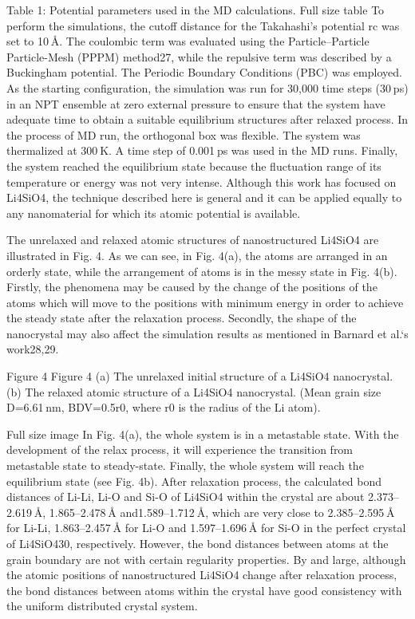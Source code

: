 \documentclass{article}
\begin{document}
Table 1: Potential parameters used in the MD calculations.
Full size table
To perform the simulations, the cutoff distance for the Takahashi’s potential rc was set to 10 Å. The coulombic term was evaluated using the Particle–Particle Particle-Mesh (PPPM) method27, while the repulsive term was described by a Buckingham potential. The Periodic Boundary Conditions (PBC) was employed. As the starting configuration, the simulation was run for 30,000 time steps (30 ps) in an NPT ensemble at zero external pressure to ensure that the system have adequate time to obtain a suitable equilibrium structures after relaxed process. In the process of MD run, the orthogonal box was flexible. The system was thermalized at 300 K. A time step of 0.001 ps was used in the MD runs. Finally, the system reached the equilibrium state because the fluctuation range of its temperature or energy was not very intense. Although this work has focused on Li4SiO4, the technique described here is general and it can be applied equally to any nanomaterial for which its atomic potential is available.

The unrelaxed and relaxed atomic structures of nanostructured Li4SiO4 are illustrated in Fig. 4. As we can see, in Fig. 4(a), the atoms are arranged in an orderly state, while the arrangement of atoms is in the messy state in Fig. 4(b). Firstly, the phenomena may be caused by the change of the positions of the atoms which will move to the positions with minimum energy in order to achieve the steady state after the relaxation process. Secondly, the shape of the nanocrystal may also affect the simulation results as mentioned in Barnard et al.‘s work28,29.

Figure 4
Figure 4
(a) The unrelaxed initial structure of a Li4SiO4 nanocrystal. (b) The relaxed atomic structure of a Li4SiO4 nanocrystal. (Mean grain size D=6.61 nm, BDV=0.5r0, where r0 is the radius of the Li atom).

Full size image
In Fig. 4(a), the whole system is in a metastable state. With the development of the relax process, it will experience the transition from metastable state to steady-state. Finally, the whole system will reach the equilibrium state (see Fig. 4b). After relaxation process, the calculated bond distances of Li-Li, Li-O and Si-O of Li4SiO4 within the crystal are about 2.373–2.619 Å, 1.865–2.478 Å and1.589–1.712 Å, which are very close to 2.385–2.595 Å for Li-Li, 1.863–2.457 Å for Li-O and 1.597–1.696 Å for Si-O in the perfect crystal of Li4SiO430, respectively. However, the bond distances between atoms at the grain boundary are not with certain regularity properties. By and large, although the atomic positions of nanostructured Li4SiO4 change after relaxation process, the bond distances between atoms within the crystal have good consistency with the uniform distributed crystal system.
\end{document}
